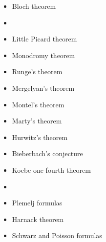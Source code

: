 \documentclass[12pt]{article}
\begin{document}
\begin{itemize}
\item Bloch theorem
\item {}
\item Little Picard theorem
\item Monodromy theorem
\item Runge's theorem
\item Mergelyan's theorem
\item Montel's theorem
\item Marty's theorem
\item Hurwitz's theorem
\item Bieberbach's conjecture
\item Koebe one-fourth theorem
\item {}
\item Plemelj formulas
\item Harnack theorem
\item Schwarz and Poisson formulas 
\end{itemize}
\end{document}
